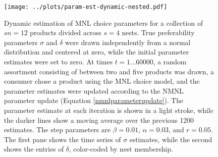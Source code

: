 \documentclass[preprint,12pt,authoryear]{elsarticle}
\begin{document}
\begin{figure}
\begin{center}\texttt{[image: ../plots/param-est-dynamic-nested.pdf]}\end{center}
\captionsetup{singlelinecheck=off}
    \caption[.]{Dynamic estimation of MNL choice parameters for a collection of $sn = 12$ products divided across $s=4$ nests. True preferability parameters $\sigma$ and $\delta$ were drawn independently from a normal distribution and centered at zero, while the initial parameter estimates were set to zero. At times $t = 1 \dots 60000$, a random assortment consisting of between two and five products was drawn, a consumer chose a product using the MNL choice model, and the parameter estimates were updated according to the NMNL parameter update (Equation \ref{nmnlparameterupdate}). The parameter estimate at each iteration is shown in a light stroke, while the darker lines show a moving average over the previous 1200 estimates. The step parameters are $\beta = 0.01$, $\alpha = 0.03$, and $r = 0.05$. The first pane shows the time series of $\sigma$ estimates, while the second shows the entries of $\delta$, color-coded by nest membership.}
\label{param-est-dynamic-nested}
\end{figure}
\end{document}
